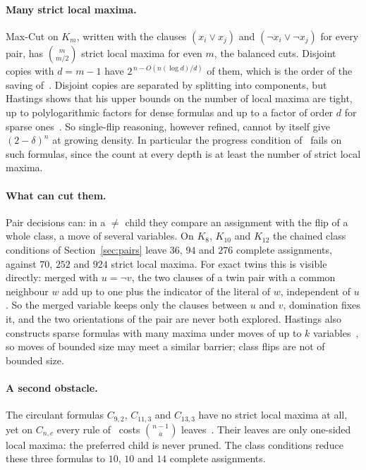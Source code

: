 \documentclass[11pt,a4paper]{article}
\theoremstyle{remark}
\begin{document}
\paragraph{Many strict local maxima.} Max-Cut on $K_m$, written with the clauses
$(x_i\lor x_j)$ and $(\neg x_i\lor\neg x_j)$ for every pair, has
$\binom m{m/2}$ strict local maxima for even $m$, the balanced cuts. Disjoint
copies with $d=m-1$ have $2^{\,n-O(n(\log d)/d)}$ of them, which is the order of
the saving of~\cite{GK14}. Disjoint copies are separated by splitting into
components, but Hastings shows that his upper bounds on the number of local
maxima are tight, up to polylogarithmic factors for dense formulas and up to a
factor of order $d$ for sparse ones~\cite{Has16}. So single-flip reasoning,
however refined, cannot by itself give $(2-\delta)^n$ at growing density. In
particular the progress condition of~\cite{N5} fails on such formulas, since the
count at every depth is at least the number of strict local maxima.

\paragraph{What can cut them.} Pair decisions can: in a $\ne$ child they compare
an assignment with the flip of a whole class, a move of several variables. On
$K_8$, $K_{10}$ and $K_{12}$ the chained class conditions of
Section~\ref{sec:pairs} leave $36$, $94$ and $276$ complete assignments,
against $70$, $252$ and $924$ strict local maxima. For exact twins this is
visible directly: merged with $u=\neg v$, the two clauses of a twin pair with a
common neighbour $w$ add up to one plus the indicator of the literal of $w$,
independent of $u$. So the merged variable keeps only the clauses between $u$
and $v$, domination fixes it, and the two orientations of the pair are never
both explored. Hastings also constructs sparse formulas with many maxima under
moves of up to $k$ variables~\cite{Has16}, so moves of bounded size may meet a
similar barrier; class flips are not of bounded size.

\paragraph{A second obstacle.} The circulant formulas $C_{9,2}$, $C_{11,3}$ and
$C_{13,3}$ have no strict local maxima at all, yet on $C_{n,c}$ every rule
of~\cite{N3} costs $\binom{n-1}a$ leaves~\cite[Theorem~13, Observation~22]{N3}.
Their leaves are only one-sided local maxima: the preferred child is never
pruned. The class conditions reduce these three formulas to $10$, $10$ and $14$
complete assignments.
\end{document}
